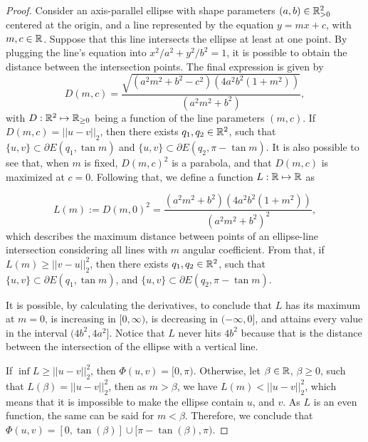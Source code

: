 \begin{proof}
	
	Consider an axis-parallel ellipse with shape parameters $(a, b)\in\mathbb{R}^2_{>0}$ centered at the origin, and a line represented by the equation $y=mx+c$, with $m, c\in \mathbb{R}$. Suppose that this line intersects the ellipse at least at one point. By plugging the line's equation into $x^2/a^2+y^2/b^2=1$, it is possible to obtain the distance between the intersection points. The final expression is given by
	\begin{equation*}\label{eq:dist_line_ellipse}
	D(m, c)=\dfrac{\sqrt{(a^2m^2+b^2-c^2)(4a^2b^2(1+m^2))}}{(a^2m^2+b^2)},
	\end{equation*}
	with $D : \mathbb{R}^2 \mapsto \mathbb{R}_{\ge0}$ being a function of the line parameters $(m, c)$.
	If $D(m, c) = ||u-v||_2$, then there exists $q_1, q_2 \in \mathbb{R}^2$, such that $\{u, v\} \subset \partial E(q_1, \tan{m})$ and $\{u, v\} \subset \partial E(q_2, \pi-\tan{m})$. It is also possible to see that, when $m$ is fixed, $D(m, c)^2$ is a parabola, and that $D(m, c)$ is maximized at $c=0$.  
	Following that, we define a function $L:\mathbb{R}\mapsto\mathbb{R}$ as
	
	\begin{equation*}
	L(m):= D(m, 0)^2 = \dfrac{(a^2m^2+b^2)(4a^2b^2(1+m^2))}{(a^2m^2+b^2)^2},
	\end{equation*}
	which describes the maximum distance between points of an ellipse-line intersection considering all lines with $m$ angular coefficient. From that, if $L(m) \ge ||v-u||_2^2$, then there exists $q_1, q_2\in\mathbb{R}^2$, such that $\{u, v\} \subset \partial E(q_1, \tan{m})$, and $\{u, v\} \subset \partial E(q_2, \pi-\tan{m})$.
	
	It is possible, by calculating the derivatives, to conclude that $L$ has its maximum at $m=0$, is increasing in $[0, \infty)$, is decreasing in $(-\infty, 0]$, and attains every value in the interval $(4b^2, 4a^2]$. Notice that $L$ never hits $4b^2$ because that is the distance between the intersection of the ellipse with a vertical line.
	
	If $\inf{L} \ge ||u-v||_2^2$, then $\Phi(u,v) = [0, \pi)$.
	Otherwise, let $\beta \in \mathbb{R}$, $\beta \ge 0$, such that $L(\beta) = ||u-v||_2^2$, then as $m>\beta$, we have $L(m) < ||u-v||_2^2$, which means that it is impossible to make the ellipse contain $u$, and $v$.
	As $L$ is an even function, the same can be said for $m < \beta$. Therefore, we conclude that $\Phi(u,v)=[0, \tan(\beta)] \cup [\pi-\tan(\beta), \pi)$.
\end{proof}




